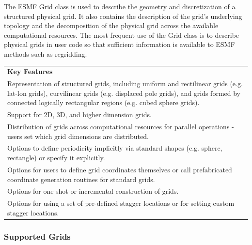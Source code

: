 %

The ESMF Grid class is used to describe the geometry and discretization
of a structured physical grid.  It also contains the description of the
grid's underlying topology and the decomposition of the physical grid
across the available computational resources.  The most frequent 
use of the Grid class is to describe physical grids in user
code so that sufficient information is available to ESMF methods
such as regridding. 

\begin{center}
\begin{tabular}{|p{6in}|}
\hline
\vspace{.01in}
{\bf Key Features} \\[.01in]
Representation of structured grids, including uniform and
rectilinear grids (e.g. lat-lon grids), curvilinear grids (e.g. displaced pole grids), 
and grids formed by connected logically rectangular regions (e.g. cubed
sphere grids).\\
Support for 2D, 3D, and higher dimension grids.\\ 
Distribution of grids across computational resources for parallel
operations -  users set which grid dimensions are distributed.\\
Options to define periodicity implicitly via standard shapes
(e.g. sphere, rectangle) or specify it explicitly.\\ 
Options for users to define grid coordinates themselves or call
prefabricated coordinate generation routines for standard grids.\\
Options for one-shot or incremental construction of grids.\\
Options for using a set of pre-defined stagger locations or for setting
custom stagger locations.\\[.03in] \hline
\end{tabular}
\end{center}

\subsubsection{Supported Grids}


